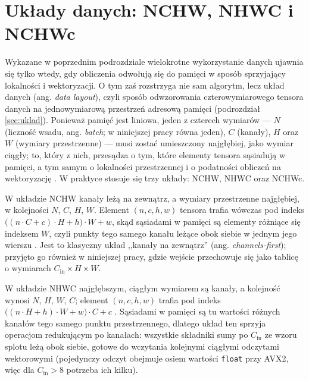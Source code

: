 \documentclass[a4paper,12pt]{book} %
\begin{document}
\section{Układy danych: NCHW, NHWC i NCHWc}
\label{sec:splot-uklady}

Wykazane w poprzednim podrozdziale wielokrotne wykorzystanie danych ujawnia się tylko wtedy, gdy obliczenia odwołują się do pamięci w sposób sprzyjający lokalności i wektoryzacji. O tym zaś rozstrzyga nie sam algorytm, lecz układ danych (ang. \emph{data layout}), czyli sposób odwzorowania czterowymiarowego tensora danych na jednowymiarową przestrzeń adresową pamięci (podrozdział \ref{sec:uklad}). Ponieważ pamięć jest liniowa, jeden z czterech wymiarów --- $N$ (liczność wsadu, ang. \emph{batch}; w niniejszej pracy równa jeden), $C$ (kanały), $H$ oraz $W$ (wymiary przestrzenne) --- musi zostać umieszczony najgłębiej, jako wymiar ciągły; to, który z nich, przesądza o tym, które elementy tensora sąsiadują w pamięci, a tym samym o lokalności przestrzennej i o podatności obliczeń na wektoryzację \cite{onednn_memory_formats}. W praktyce stosuje się trzy układy: NCHW, NHWC oraz NCHWc.

W układzie NCHW kanały leżą na zewnątrz, a wymiary przestrzenne najgłębiej, w kolejności $N$, $C$, $H$, $W$. Element $(n, c, h, w)$ tensora trafia wówczas pod indeks $\bigl((n \cdot C + c)\cdot H + h\bigr)\cdot W + w$, skąd sąsiadami w pamięci są elementy różniące się indeksem $W$, czyli punkty tego samego kanału leżące obok siebie w jednym jego wierszu \cite{onednn_memory_formats}. Jest to klasyczny układ ,,kanały na zewnątrz'' (ang. \emph{channels-first}); przyjęto go również w niniejszej pracy, gdzie wejście przechowuje się jako tablicę o wymiarach $C_{\mathrm{in}} \times H \times W$.

W układzie NHWC najgłębszym, ciągłym wymiarem są kanały, a kolejność wynosi $N$, $H$, $W$, $C$; element $(n, c, h, w)$ trafia pod indeks $\bigl((n \cdot H + h)\cdot W + w\bigr)\cdot C + c$ \cite{onednn_memory_formats}. Sąsiadami w pamięci są tu wartości różnych kanałów tego samego punktu przestrzennego, dlatego układ ten sprzyja operacjom redukującym po kanałach: wszystkie składniki sumy po $C_{\mathrm{in}}$ ze wzoru splotu leżą obok siebie, gotowe do wczytania kolejnymi ciągłymi odczytami wektorowymi (pojedynczy odczyt obejmuje osiem wartości \texttt{float} przy AVX2, więc dla $C_{\mathrm{in}} > 8$ potrzeba ich kilku).
\end{document}
